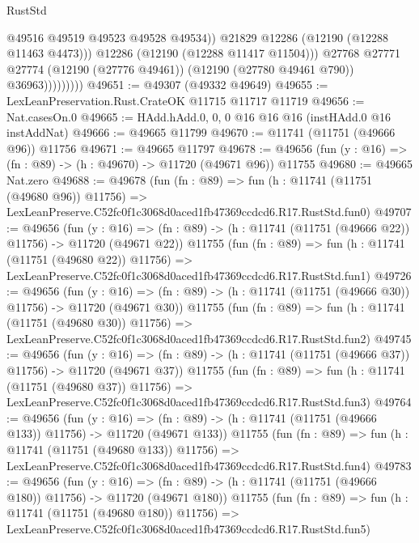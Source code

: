 \begin{lexlean}{RustStd}
\begin{coremodule}
                              @49516
                              @49519
                              @49523
                              @49528
                              @49534))
                          @21829
                          @12286
                          (@12190 (@12288 @11463 @4473)))
                        @12286
                        (@12190 (@12288 @11417 @11504)))
                      @27768
                      @27771
                      @27774
                      (@12190 (@27776 @49461))
                      (@12190 (@27780 @49461 @790))
                      @36963)))))))))
@49651 := @49307 (@49332 @49649)
@49655 := LexLeanPreservation.Rust.CrateOK @11715 @11717 @11719
@49656 := Nat.casesOn.{0}
@49665 := HAdd.hAdd.{0, 0, 0} @16 @16 @16 (instHAdd.{0} @16 instAddNat)
@49666 := @49665 @11799
@49670 := @11741 (@11751 (@49666 @96)) @11756
@49671 := @49665 @11797
@49678 := @49656 (fun (y : @16) => (fn : @89) -> (h : @49670) -> @11720 (@49671 @96)) @11755
@49680 := @49665 Nat.zero
@49688 := @49678
    (fun (fn : @89) =>
    fun (h : @11741 (@11751 (@49680 @96)) @11756) =>
    LexLeanPreserve.C52fc0f1c3068d0aced1fb47369ccdcd6.R17.RustStd.fun0)
@49707 := @49656
    (fun (y : @16) =>
    (fn : @89) -> (h : @11741 (@11751 (@49666 @22)) @11756) -> @11720 (@49671 @22))
    @11755
    (fun (fn : @89) =>
    fun (h : @11741 (@11751 (@49680 @22)) @11756) =>
    LexLeanPreserve.C52fc0f1c3068d0aced1fb47369ccdcd6.R17.RustStd.fun1)
@49726 := @49656
    (fun (y : @16) =>
    (fn : @89) -> (h : @11741 (@11751 (@49666 @30)) @11756) -> @11720 (@49671 @30))
    @11755
    (fun (fn : @89) =>
    fun (h : @11741 (@11751 (@49680 @30)) @11756) =>
    LexLeanPreserve.C52fc0f1c3068d0aced1fb47369ccdcd6.R17.RustStd.fun2)
@49745 := @49656
    (fun (y : @16) =>
    (fn : @89) -> (h : @11741 (@11751 (@49666 @37)) @11756) -> @11720 (@49671 @37))
    @11755
    (fun (fn : @89) =>
    fun (h : @11741 (@11751 (@49680 @37)) @11756) =>
    LexLeanPreserve.C52fc0f1c3068d0aced1fb47369ccdcd6.R17.RustStd.fun3)
@49764 := @49656
    (fun (y : @16) =>
    (fn : @89) -> (h : @11741 (@11751 (@49666 @133)) @11756) -> @11720 (@49671 @133))
    @11755
    (fun (fn : @89) =>
    fun (h : @11741 (@11751 (@49680 @133)) @11756) =>
    LexLeanPreserve.C52fc0f1c3068d0aced1fb47369ccdcd6.R17.RustStd.fun4)
@49783 := @49656
    (fun (y : @16) =>
    (fn : @89) -> (h : @11741 (@11751 (@49666 @180)) @11756) -> @11720 (@49671 @180))
    @11755
    (fun (fn : @89) =>
    fun (h : @11741 (@11751 (@49680 @180)) @11756) =>
    LexLeanPreserve.C52fc0f1c3068d0aced1fb47369ccdcd6.R17.RustStd.fun5)

\end{coremodule}
\end{lexlean}
